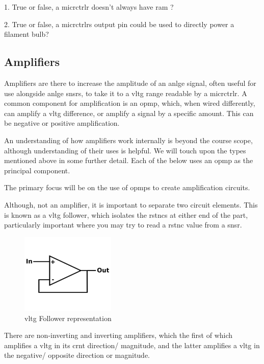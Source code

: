 \documentclass[a4paper,11pt]{report}
\newcommand{\Quiz}[1] %
{
\par\noindent %
\phantomsection %
\todo[inline, color=blue!30]{\textbf{#1}} %
\vspace{1em} %
}
\begin{document}
\Quiz{Quiz}

1. True or false, a \gls{micrctrlr} doesn't always have \gls{ram} ?

2. True or false, a \gls{micrctrlr}s output pin could be used to directly power a filament bulb?

\vspace*{1\baselineskip}

\subsection{Amplifiers}

Amplifiers are there to increase the amplitude of an \gls{anlge} signal, often useful for use alongside \gls{anlge} \gls{snsr}s, to take it to a \gls{vltg} range readable by a \gls{micrctrlr}. A common component for amplification is an \gls{opmp}, which, when wired differently, can amplify a \gls{vltg} difference, or amplify a signal by a specific amount. This can be negative or positive amplification.

An understanding of how amplifiers work internally is beyond the course scope, although understanding of their uses is helpful. We will touch upon the types mentioned above in some further detail. Each of the below uses an \gls{opmp} as the principal component.

The primary focus will be on the use of \gls{opmp}s to create amplification circuits.

Although, not an amplifier, it is important to separate two circuit elements. This is known as a \gls{vltg} follower, which isolates the \gls{rstnc}s at either end of the part, particularly important where you may try to read a \gls{rstnc} value from a \gls{snsr}.

\begin{figure}[H]
\centering
\includegraphics[width=0.4\textwidth]{voltagefollower}
\caption{\gls{vltg} Follower representation}
\end{figure}

There are non-inverting and inverting amplifiers, which the first of which amplifies a \gls{vltg} in its \gls{crnt} direction/ magnitude, and the latter amplifies a \gls{vltg} in the negative/ opposite direction or magnitude.
\end{document}
